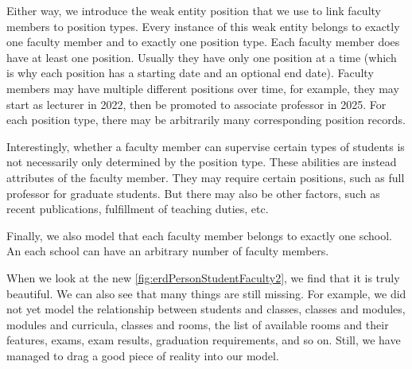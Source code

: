Either way, we introduce the weak entity position that we use to link faculty members to position types.
Every instance of this weak entity belongs to exactly one faculty member and to exactly one position type.
Each faculty member does have at least one position.
Usually they have only one position at a time (which is why each position has a starting date and an optional end date).
Faculty members may have multiple different positions over time, for example, they may start as lecturer in 2022, then be promoted to associate professor in 2025.
For each position type, there may be arbitrarily many corresponding position records.

Interestingly, whether a faculty member can supervise certain types of students is not necessarily only determined by the position type.
These abilities are instead attributes of the faculty member.
They may require certain positions, such as full professor for graduate students.
But there may also be other factors, such as recent publications, fulfillment of teaching duties, etc.

Finally, we also model that each faculty member belongs to exactly one school.
An each school can have an arbitrary number of faculty members.

When we look at the new \cref{fig:erdPersonStudentFaculty2}, we find that it is truly beautiful.
We can also see that many things are still missing.
For example, we did not yet model the relationship between students and classes, classes and modules, modules and curricula, classes and rooms, the list of available rooms and their features, exams, exam results, graduation requirements, and so on.
Still, we have managed to drag a good piece of reality into our model.%
%
\FloatBarrier%
\endhsection%
%
